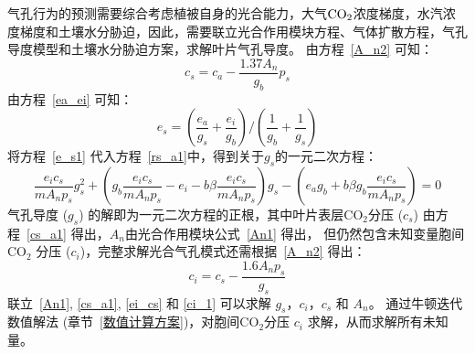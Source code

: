 气孔行为的预测需要综合考虑植被自身的光合能力，大气$\rm CO_2$浓度梯度，水汽浓度梯度和土壤水分胁迫，因此，需要联立光合作用模块方程、气体扩散方程，气孔导度模型和土壤水分胁迫方案，求解叶片气孔导度。
由方程~\eqref{A_n2} 可知：
\begin{equation}\label{cs_a1}
c_{s}=c_{a}-\frac{1.37 A_{n}}{g_{b}} p_{s}
\end{equation}
由方程~\eqref{ea_ei} 可知：
\begin{equation}\label{e_s1}
e_{s}=\left(\frac{e_{a}}{g_{s}}+\frac{e_{i}}{g_{b}}\right) /\left(\frac{1}{g_{b}}+\frac{1}{g_{s}}\right)
\end{equation}
将方程~\eqref{e_s1} 代入方程~\eqref{rs_a1}中，得到关于$g_s$的一元二次方程：
\begin{equation}\label{ei_cs}
\frac{e_{i} c_{s}}{m A_{n} p_{s}} g_{s}^{2}+\left(g_{b} \frac{e_{i} c_{s}}{m A_{n} p_{s}}-e_{i}-b \beta \frac{e_{i} c_{s}}{m A_{n} p_{s}}\right) g_{s}
-\left(e_{a} g_{b}+b \beta g_{b} \frac{e_{i} c_{s}}{m A_{n} p_{s}}\right)=0
\end{equation}
气孔导度 ($g_s$) 的解即为一元二次方程的正根，其中叶片表层$\mathrm{CO_2}$分压 ($c_s$) 由方程~\eqref{cs_a1} 得出，$A_n$由光合作用模块公式~\eqref{An1} 得出，
但仍然包含未知变量胞间 $\mathrm{CO_2}$ 分压 ($c_i$)，完整求解光合气孔模式还需根据~\eqref{A_n2} 得出：
\begin{equation}\label{ci_1}
c_{i}=c_{s}-\frac{1.6 A_{n} p_{s}}{g_{s}}
\end{equation}
联立~\eqref{An1}, \eqref{cs_a1}, \eqref{ei_cs} 和 \eqref{ci_1} 可以求解 $g_s$，$c_i$，$c_s$ 和 $A_n$。
通过牛顿迭代数值解法 (章节~\ref{数值计算方案})，对胞间$\mathrm{CO_2}$分压 $c_i$ 求解，从而求解所有未知量。

